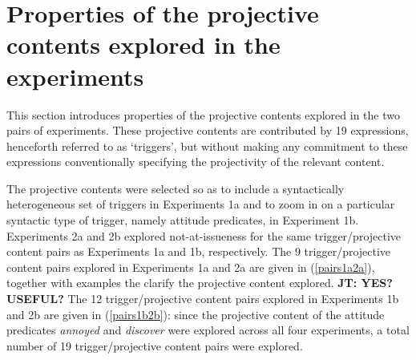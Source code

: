 \documentclass[11pt,fleqn]{article}
\newcommand{\6}{\mbox{$[\hspace*{-.6mm}[$}}
\newcommand{\9}{\mbox{$]\hspace*{-.6mm}]$}}
\begin{document}
\section{Properties of the projective contents explored in the experiments}\label{s2}

This section introduces properties of the projective contents explored in the two pairs of experiments. These projective contents are contributed by 19 expressions, henceforth referred to as `triggers', but without making any commitment to these expressions conventionally specifying the projectivity of the relevant content. 

The projective contents were selected so as to include a syntactically heterogeneous set of triggers in Experiments 1a and to zoom in on a particular syntactic type of trigger, namely attitude predicates, in Experiment 1b. Experiments 2a and 2b explored not-at-issueness for the same trigger/projective content pairs as Experiments 1a and 1b, respectively. The 9 trigger/projective content pairs explored in Experiments 1a and 2a are given in (\ref{pairs1a2a}), together with examples the clarify the projective content explored. {\bf JT: YES? USEFUL?} The 12 trigger/projective content pairs explored in Experiments 1b and 2b are given in (\ref{pairs1b2b}): since the projective content of the attitude predicates {\em annoyed} and {\em discover} were explored across all four experiments, a total number of 19 trigger/projective content pairs were explored.
\end{document}
